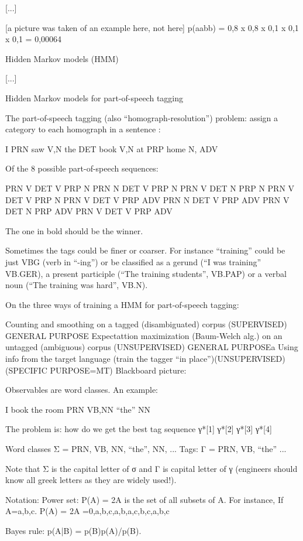 [...]

[a picture was taken of an example here, not here]
p(aabb) = 0,8 x 0,8 x 0,1 x 0,1 x 0,1 = 0,00064



Hidden Markov models (HMM)

[...]

Hidden Markov models for part-of-speech tagging

The part-of-speech tagging (also “homograph-resolution”) problem: assign a category to each homograph in a sentence :

I {PRN}
saw {V,N}
the {DET}
book {V,N}
at {PRP}
home {N, ADV}

Of the 8 possible part-of-speech sequences:

PRN V DET V PRP N
PRN N DET V PRP N
PRN V DET N PRP N
PRN V DET V PRP N
PRN V DET V PRP ADV 
PRN N DET V PRP ADV
PRN V DET N PRP ADV
PRN V DET V PRP ADV

The one in bold should be the winner.

Sometimes the tags could be finer or coarser. For instance “training” could be just VBG (verb in “-ing”) or be classified as a gerund (“I was training” VB.GER), a present participle (“The training students”, VB.PAP) or a verbal noun (“The training was hard”, VB.N).

On the three ways of training a HMM for part-of-speech tagging:

Counting and smoothing on a tagged (disambiguated) corpus (SUPERVISED) GENERAL PURPOSE
Expectattion maximization (Baum-Welch alg.) on an untagged (ambiguous) corpus (UNSUPERVISED) GENERAL PURPOSEa
Using info from the target language (train the tagger “in place”)(UNSUPERVISED) (SPECIFIC PURPOSE=MT)
Blackboard picture:


Observables are word classes. An example:

I book the room
{PRN} {VB,NN} “the” {NN}

The problem is: how do we get the best tag sequence γ*[1] γ*[2] γ*[3] γ*[4]

Word classes Σ = { {PRN}, {VB, NN}, “the”, {NN}, ...}
Tags: Γ = { PRN, VB, “the” ...}

Note that Σ is the capital letter of σ and Γ is capital letter of γ (engineers should know all greek letters as they are widely used!).

Notation: Power set: P(A) = 2A  is the set of all subsets of A. For instance, If A={a,b,c}. P(A) = 2A ={0,{a},{b},{c},{a,b},{a,c},{b,c},{a,b,c}}

Bayes rule: p(A|B) = p(B)p(A)/p(B).

